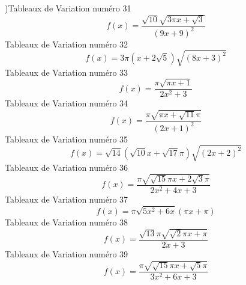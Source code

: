 \documentclass{article}
\begin{document}
\pi\right)\]Tableaux de Variation num\'ero 31 \[f(x) = \frac{\sqrt{10} \sqrt{3 \pi x + \sqrt{3}}}{\left(9 x + 9\right)^{2}}\]Tableaux de Variation num\'ero 32 \[f(x) = 3 \pi \left(x + 2 \sqrt{5}\right) \sqrt{\left(8 x + 3\right)^{2}}\]Tableaux de Variation num\'ero 33 \[f(x) = \frac{\pi \sqrt{\pi x + 1}}{2 x^{2} + 3}\]Tableaux de Variation num\'ero 34 \[f(x) = \frac{\pi \sqrt{\pi x + \sqrt{11} \pi}}{\left(2 x + 1\right)^{2}}\]Tableaux de Variation num\'ero 35 \[f(x) = \sqrt{14} \left(\sqrt{10} x + \sqrt{17} \pi\right) \sqrt{\left(2 x + 2\right)^{2}}\]Tableaux de Variation num\'ero 36 \[f(x) = \frac{\pi \sqrt{\sqrt{15} \pi x + 2 \sqrt{3} \pi}}{2 x^{2} + 4 x + 3}\]Tableaux de Variation num\'ero 37 \[f(x) = \pi \sqrt{5 x^{2} + 6 x} \left(\pi x + \pi\right)\]Tableaux de Variation num\'ero 38 \[f(x) = \frac{\sqrt{13} \pi \sqrt{\sqrt{2} \pi x + \pi}}{2 x + 3}\]Tableaux de Variation num\'ero 39 \[f(x) = \frac{\pi \sqrt{\sqrt{15} \pi x + \sqrt{5} \pi}}{3 x^{2} + 6 x + 3}\]
\end{document}
